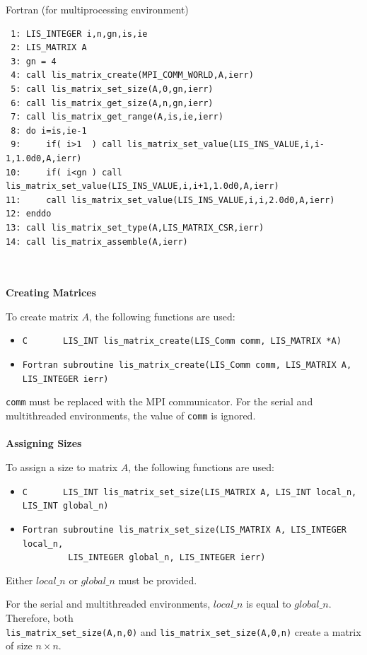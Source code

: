 \documentclass[a4paper]{article}
\begin{document}
\begin{itemsquarebox}[l]{Fortran (for multiprocessing environment)}
\small
\begin{verbatim}
 1: LIS_INTEGER i,n,gn,is,ie                 
 2: LIS_MATRIX A
 3: gn = 4
 4: call lis_matrix_create(MPI_COMM_WORLD,A,ierr)
 5: call lis_matrix_set_size(A,0,gn,ierr)
 6: call lis_matrix_get_size(A,n,gn,ierr)
 7: call lis_matrix_get_range(A,is,ie,ierr)
 8: do i=is,ie-1
 9:     if( i>1  ) call lis_matrix_set_value(LIS_INS_VALUE,i,i-1,1.0d0,A,ierr)
10:     if( i<gn ) call lis_matrix_set_value(LIS_INS_VALUE,i,i+1,1.0d0,A,ierr)
11:     call lis_matrix_set_value(LIS_INS_VALUE,i,i,2.0d0,A,ierr)
12: enddo
13: call lis_matrix_set_type(A,LIS_MATRIX_CSR,ierr)
14: call lis_matrix_assemble(A,ierr)
\end{verbatim}
\end{itemsquarebox}
\\ \\
\noindent
{\bf Creating Matrices}

To create matrix $A$, the following functions are used: 
\begin{itemize}
\item \verb|C       LIS_INT lis_matrix_create(LIS_Comm comm, LIS_MATRIX *A)|
\item \verb|Fortran subroutine lis_matrix_create(LIS_Comm comm, LIS_MATRIX A, LIS_INTEGER ierr)|
\end{itemize}
{\tt comm} must be replaced with the MPI communicator. 
For the serial and multithreaded environments, the value of {\tt comm} is ignored.
\\ \\
\noindent
{\bf Assigning Sizes}

To assign a size to matrix $A$, the following functions are used: 
\begin{itemize}
\item \verb|C       LIS_INT lis_matrix_set_size(LIS_MATRIX A, LIS_INT local_n, LIS_INT global_n)|
\item \verb|Fortran subroutine lis_matrix_set_size(LIS_MATRIX A, LIS_INTEGER local_n,|\\
      \verb|         LIS_INTEGER global_n, LIS_INTEGER ierr)|
\end{itemize}
Either $local\_n$ or $global\_n$ must be provided. 

For the serial and multithreaded environments, $local\_n$ is
equal to $global\_n$. 
Therefore, both \\
\verb|lis_matrix_set_size(A,n,0)| and \verb|lis_matrix_set_size(A,0,n)|
create a matrix of size $n \times n$.
\end{document}
